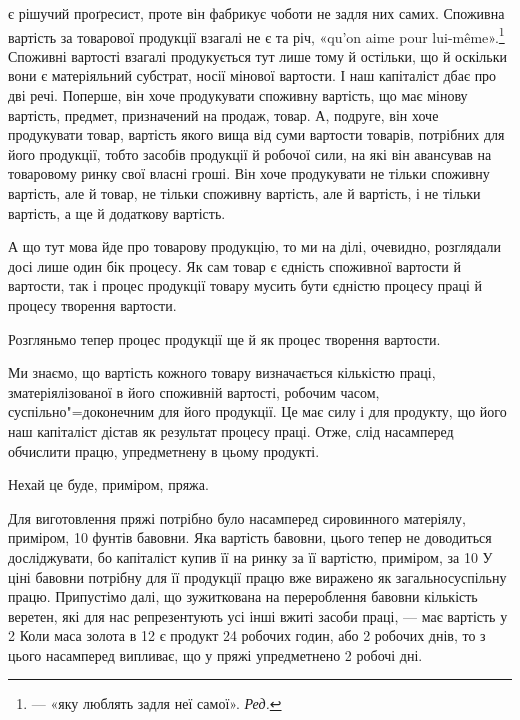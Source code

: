 \parcont{}  %
є рішучий проґресист, проте він фабрикує чоботи не задля них
самих. Споживна вартість за товарової продукції взагалі не є
та річ, «qu’on aime pour lui-même».\footnote*{
— «яку люблять задля неї самої». \emph{Ред.}
} Споживні вартості взагалі
продукується тут лише тому й остільки, що й оскільки вони є
матеріяльний субстрат, носії мінової вартости. І наш капіталіст
дбає про дві речі. Поперше, він хоче продукувати споживну
вартість, що має мінову вартість, предмет, призначений на продаж,
товар. А, подруге, він хоче продукувати товар, вартість
якого вища від суми вартости товарів, потрібних для його продукції,
тобто засобів продукції й робочої сили, на які він авансував
на товаровому ринку свої власні гроші. Він хоче продукувати
не тільки споживну вартість, але й товар, не тільки споживну
вартість, але й вартість, і не тільки вартість, а ще й додаткову
вартість.

А що тут мова йде про товарову продукцію, то ми на ділі,
очевидно, розглядали досі лише один бік процесу. Як сам товар
є єдність споживної вартости й вартости, так і процес продукції
товару мусить бути єдністю процесу праці й процесу творення
вартости.

Розгляньмо тепер процес продукції ще й як процес творення
вартости.

Ми знаємо, що вартість кожного товару визначається кількістю
праці, зматеріялізованої в його споживній вартості, робочим
часом, суспільно"=доконечним для його продукції. Це має силу
і для продукту, що його наш капіталіст дістав як результат процесу
праці. Отже, слід насамперед обчислити працю, упредметнену
в цьому продукті.

Нехай це буде, приміром, пряжа.

Для виготовлення пряжі потрібно було насамперед сировинного
матеріялу, приміром, 10 фунтів бавовни. Яка вартість бавовни,
цього тепер не доводиться досліджувати, бо капіталіст
купив її на ринку за її вартістю, приміром, за 10 У ціні
бавовни потрібну для її продукції працю вже виражено як загальносуспільну
працю. Припустімо далі, що зужиткована на
перероблення бавовни кількість веретен, які для нас репрезентують
усі інші вжиті засоби праці, — має вартість у 2
Коли маса золота в 12 є продукт 24 робочих годин, або
2 робочих днів, то з цього насамперед випливає, що у пряжі упредметнено
2 робочі дні.

